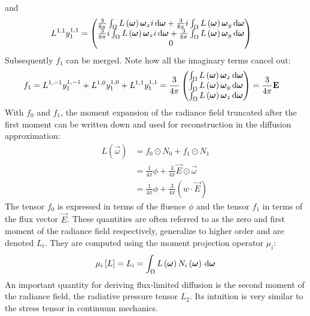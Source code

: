 and
\begin{align}
L^{1,1}y^{1,1}_1 &= 
\begin{pmatrix}
\frac{3}{8\pi}\int_\Omega{L\left(\boldsymbol{\mathbf{\omega}}\right)\boldsymbol{\mathbf{\omega}}_xi\,\mathrm{d}\boldsymbol{\mathbf{\omega}}} + \frac{3}{8\pi}i\int_\Omega{L\left(\boldsymbol{\mathbf{\omega}}\right)\boldsymbol{\mathbf{\omega}}_y\,\mathrm{d}\boldsymbol{\mathbf{\omega}}}
\\
\frac{3}{8\pi}i\int_\Omega{L\left(\boldsymbol{\mathbf{\omega}}\right)\boldsymbol{\mathbf{\omega}}_xi\,\mathrm{d}\boldsymbol{\mathbf{\omega}}} + \frac{3}{8\pi}\int_\Omega{L\left(\boldsymbol{\mathbf{\omega}}\right)\boldsymbol{\mathbf{\omega}}_y\,\mathrm{d}\boldsymbol{\mathbf{\omega}}}
\\
0
\end{pmatrix}
\end{align}
Subsequently $f_1$ can be merged. Note how all the imaginary terms cancel out:
\begin{align}
f_1 &= 
L^{1,-1}y^{1,-1}_1+L^{1,0}y^{1,0}_1+L^{1,1}y^{1,1}_1
=
\frac{3}{4\pi}
\begin{pmatrix}
\int_\Omega{L\left(\boldsymbol{\mathbf{\omega}}\right)\boldsymbol{\mathbf{\omega}}_x\,\mathrm{d}\boldsymbol{\mathbf{\omega}}}
\\
\int_\Omega{L\left(\boldsymbol{\mathbf{\omega}}\right)\boldsymbol{\mathbf{\omega}}_y\,\mathrm{d}\boldsymbol{\mathbf{\omega}}}
\\
\int_\Omega{L\left(\boldsymbol{\mathbf{\omega}}\right)\boldsymbol{\mathbf{\omega}}_z\,\mathrm{d}\boldsymbol{\mathbf{\omega}}}
\end{pmatrix}
=
\frac{3}{4\pi}\boldsymbol{\mathbf{E}}
\end{align}
With $f_0$ and $f_1$, the moment expansion of the radiance field truncated after the first moment can be written down and used for reconstruction in the diffusion approximation:
\begin{align}
\nonumber
L\left(\vec{\omega}\right) &= 
f_0\odot N_0 + f_1\odot N_1
\\
\nonumber
&=
\frac{1}{4\pi}\phi + \frac{3}{4\pi}\vec{E} \odot \vec{\omega}
\\
\label{eq:moment_expansion_L}
&=
\frac{1}{4\pi}\phi + \frac{3}{4\pi}\left(w \cdot \vec{E}\right)
\end{align}
The tensor $f_0$ is expressed in terms of the fluence $\phi$ and the tensor $f_1$ in terms of the flux vector $\vec{E}$. These quantities are often referred to as the zero and first moment of the radiance field respectively, generalize to higher order and are denoted $L_i$. They are computed using the moment projection operator $\mu_i$:
\begin{align}
\label{eq:moment_expansion_mu}
\mu_i\left[L\right] = L_i = \int_\Omega{L\left(\boldsymbol{\mathbf{\omega}}\right)N_i\left(\boldsymbol{\mathbf{\omega}}\right)\,\mathrm{d}\boldsymbol{\mathbf{\omega}}}
\end{align}
An important quantity for deriving flux-limited diffusion is the second moment of the radiance field, the radiative pressure tensor $L_2$. Its intuition is very similar to the stress tensor in continuum mechanics.

